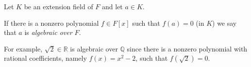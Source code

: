 \documentclass{article}
\begin{document}
Let $K$ be an extension field of $F$ and let $a\in K$. 

If there is  a nonzero polynomial $f\in F[x]$ such that $f(a)=0$ (in $K$) we say that $a$ is \emph{algebraic over $F$}.

For example, $\sqrt{2}\in\mathbb{R}$ is algebraic over $\mathbb{Q}$ since there is a nonzero polynomial with rational coefficients, namely $f(x)=x^2-2$, such that $f(\sqrt{2})=0$.
\end{document}
